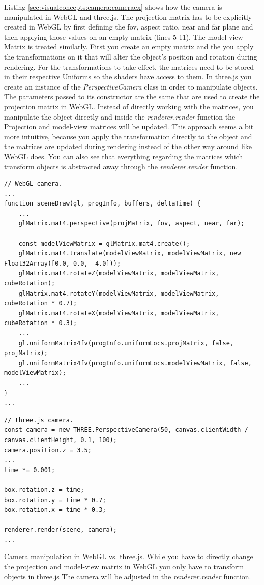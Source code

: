 Listing \ref{sec:visualconcepts:camera:cameraex} shows how the camera is manipulated in WebGL and three.js. The projection matrix has to be explicitly created in WebGL by first defining the fov, aspect ratio, near and far plane and then applying those values on an empty matrix (lines 5-11). The model-view Matrix is treated similarly. First you create an empty matrix and the you apply the transformations on it that will alter the object's position and rotation during rendering. For the transformations to take effect, the matrices need to be stored in their respective Uniforms so the shaders have access to them. In three.js you create an instance of the \textit{PerspectiveCamera} class in order to manipulate objects. The parameters passed to its constructor are the same that are used to create the projection matrix in WebGL. Instead of directly working with the matrices, you manipulate the object directly and inside the \textit{renderer.render} function the Projection and model-view matrices will be updated. This approach seems a bit more intuitive, because you apply the transformation directly to the object and the matrices are updated during rendering instead of the other way around like WebGL does. You can also see that everything regarding the matrices which transform objects is abstracted away through the \textit{renderer.render} function.

\begin{listing}[H]
\begin{verbatim}
// WebGL camera.
...
function sceneDraw(gl, progInfo, buffers, deltaTime) {
	...
    glMatrix.mat4.perspective(projMatrix, fov, aspect, near, far);

    const modelViewMatrix = glMatrix.mat4.create();
    glMatrix.mat4.translate(modelViewMatrix, modelViewMatrix, new Float32Array([0.0, 0.0, -4.0]));
    glMatrix.mat4.rotateZ(modelViewMatrix, modelViewMatrix, cubeRotation);
    glMatrix.mat4.rotateY(modelViewMatrix, modelViewMatrix, cubeRotation * 0.7);
    glMatrix.mat4.rotateX(modelViewMatrix, modelViewMatrix, cubeRotation * 0.3);
   	...
   	gl.uniformMatrix4fv(progInfo.uniformLocs.projMatrix, false, projMatrix);
    gl.uniformMatrix4fv(progInfo.uniformLocs.modelViewMatrix, false, modelViewMatrix);
   	...
}
...
\end{verbatim}
\begin{verbatim}
// three.js camera.		
const camera = new THREE.PerspectiveCamera(50, canvas.clientWidth / canvas.clientHeight, 0.1, 100);
camera.position.z = 3.5;
...
time *= 0.001;
    
box.rotation.z = time;
box.rotation.y = time * 0.7;
box.rotation.x = time * 0.3;
    
renderer.render(scene, camera);
...
\end{verbatim}
\caption{Camera manipulation in WebGL vs. three.js. While you have to directly change the projection and model-view matrix in WebGL you only have to transform objects in three.js The camera will be adjusted in the \textit{renderer.render} function.}
\label{sec:visualconcepts:camera:cameraex}
\end{listing}

